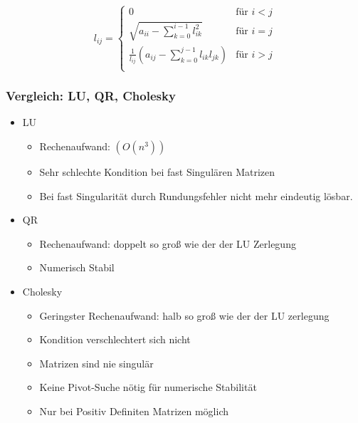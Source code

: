 \begin{displaymath}
	l_{ij} =
	\begin{cases}
		0 & \text{für } i<j \\
		\sqrt{a_{ii} - \sum_{k=0}^{i-1}l_{ik}^2} & \text{für } i=j \\
		\frac{1}{l_{ij}} (a_{ij} - \sum_{k=0}^{j-1}l_{ik}l_{jk}) & \text{für } i>j \\
	\end{cases}
\end{displaymath}

\subsubsection*{Vergleich: LU, QR, Cholesky}
\begin{itemize}

	\item LU
	\begin{itemize}
		\item Rechenaufwand: $(O(n^3))$
		\item Sehr schlechte Kondition bei fast Singulären Matrizen
		\item Bei fast Singularität durch Rundungsfehler nicht mehr eindeutig lösbar.
	\end{itemize}
	
	\item QR
	\begin{itemize}
		\item Rechenaufwand: doppelt so groß wie der der LU Zerlegung
		\item Numerisch Stabil 
	\end{itemize}
	
	\item Cholesky
	\begin{itemize}
		\item Geringster Rechenaufwand: halb so groß wie der der LU zerlegung 
		\item Kondition verschlechtert sich nicht
		\item Matrizen sind nie singulär
		\item Keine Pivot-Suche nötig für numerische Stabilität
		\item Nur bei Positiv Definiten Matrizen möglich
	\end{itemize}

\end{itemize}

